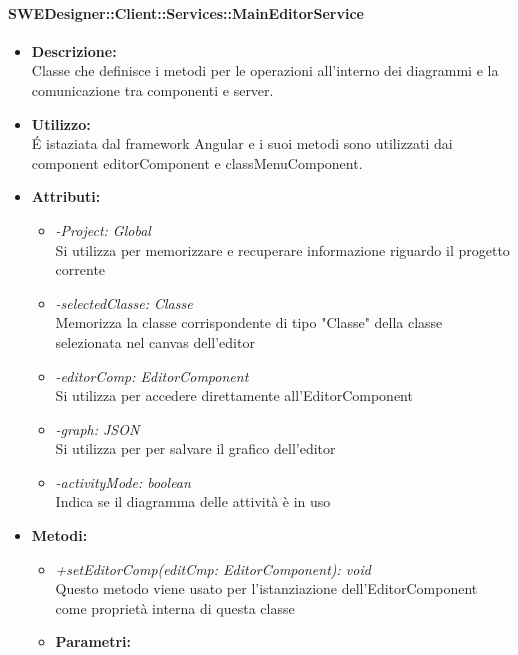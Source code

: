           	\paragraph{SWEDesigner::Client::Services::MainEditorService}
				\begin{itemize}
          			\item \textbf{Descrizione:}\\
          			Classe che definisce i metodi per le operazioni all’interno dei diagrammi e la comunicazione tra componenti e server.
          			\item \textbf{Utilizzo:}\\
          			É istaziata dal framework Angular e i suoi metodi sono utilizzati dai component editorComponent e classMenuComponent.
          			\item \textbf{Attributi:}\\
          			\begin{itemize}
          				\item \emph{-Project: Global}\\
          				Si utilizza per memorizzare e recuperare informazione riguardo il progetto corrente
          				\item \emph{-selectedClasse: Classe}\\
          				Memorizza la classe corrispondente di tipo "Classe" della classe selezionata nel canvas dell'editor
          				\item \emph{-editorComp: EditorComponent}\\
          				Si utilizza per accedere direttamente all'EditorComponent
          				\item \emph{-graph: JSON}\\
          				Si utilizza per per salvare il grafico dell'editor
          				\item \emph{-activityMode: boolean}\\
          				Indica se il diagramma delle attività è in uso
          			\end{itemize}
          			\item \textbf{Metodi:}\\
          			\begin{itemize}
          				\item \emph{+setEditorComp(editCmp: EditorComponent): void}\\
          				Questo metodo viene usato per l'istanziazione dell'EditorComponent come proprietà interna di questa classe
          				\item \textbf{Parametri:}\\

\end{itemize}
\end{itemize}

